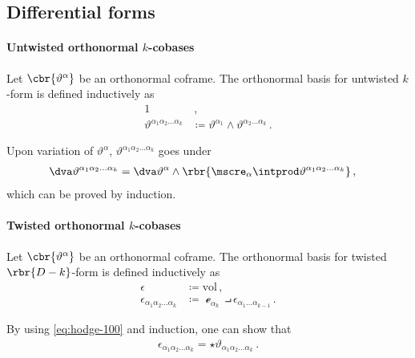 \documentclass[a4paper]{article}
\begin{document}

\subsection{Differential forms}


\paragraph{Untwisted orthonormal $k$-cobases}
Let $\cbr{\vartheta^{\alpha}}$ be an orthonormal coframe. The orthonormal 
basis for untwisted $k$-form is defined inductively as
\begin{align}
1&\,, \\
\vartheta^{\alpha_{1}\alpha_{2}\ldots \alpha_{k}} &\coloneqq 
	\vartheta^{\alpha_{1}} \wedge \vartheta^{\alpha_{2}\ldots \alpha_{k}}\,.
\end{align}

Upon variation of $\vartheta^{\alpha}$, $\vartheta^{\alpha_{1}\alpha_{2}\ldots 
\alpha_{k}}$ goes under
\begin{align}
\dva \vartheta^{\alpha_{1}\alpha_{2}\ldots \alpha_{k}} &=
\dva \vartheta^{\alpha} \wedge \rbr{\mscre_{\alpha}\intprod 
	\vartheta^{\alpha_{1}\alpha_{2}\ldots \alpha_{k}}}\,,
\end{align}
which can be proved by induction.

\paragraph{Twisted orthonormal $k$-cobases}
Let $\cbr{\vartheta^{\alpha}}$ be an orthonormal coframe. The orthonormal 
basis for twisted $\rbr{D-k}$-form is defined inductively as
\begin{align}
\epsilon &\coloneqq \mathrm{vol}\,, \\
\epsilon_{\alpha_{1}\alpha_{2}\ldots \alpha_{k}} &\coloneqq
\mscre_{\alpha_{k}} \intprod \epsilon_{\alpha_{1}\ldots \alpha_{k-1}}\,.
\end{align}

By using \cref{eq:hodge-100} and induction, one can show that
\begin{align}
\epsilon_{\alpha_{1}\alpha_{2}\ldots \alpha_{k}} =
\star \vartheta_{\alpha_{1}\alpha_{2}\ldots \alpha_{k}}\,.
\end{align}
\end{document}
